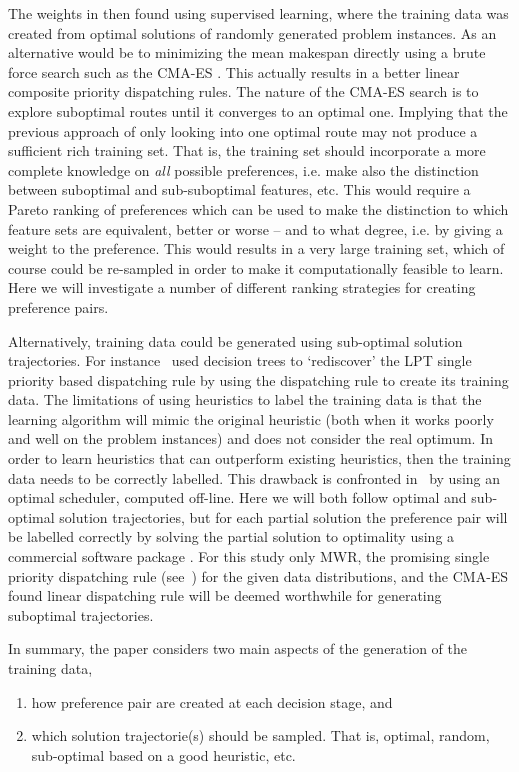 \documentclass[smallextended]{llncs}
\newcommand{\citep}[1]{\cite{#1}}
\begin{document}
The weights in \cite{InRu11a} then found using supervised learning, where the training data was created from optimal 
solutions of randomly generated problem instances. As an alternative would be to minimizing the mean makespan  
directly using a brute force search such as the CMA-ES \citep{Hansen01}. This actually results in a better linear 
composite priority dispatching rules. The nature of the CMA-ES search is to explore suboptimal routes until it 
converges to an optimal one. Implying that the previous approach of only looking into one optimal route may not 
produce a sufficient rich training set. That is, the training set should incorporate a more complete knowledge on 
\emph{all} possible preferences, i.e. make also the distinction between suboptimal and sub-suboptimal features, etc.  
This would require a Pareto ranking of preferences which can be used to make the distinction to which feature sets are 
equivalent, better or worse -- and to what degree, i.e. by giving a weight to the preference. This would results in a 
very large training set, which of course could be re-sampled in order to make it computationally feasible to learn. 
Here we will investigate a number of different ranking strategies for creating preference pairs.

Alternatively, training data could be generated using sub-optimal solution trajectories. For instance~\cite{Siggi05} 
used decision trees to `rediscover' the LPT single priority based dispatching rule by 
using the dispatching rule to create its training data. The limitations of using heuristics to label the training data 
is that the learning algorithm will mimic the original heuristic (both when it works poorly and well on the problem 
instances) and does not consider the real optimum. In order to learn heuristics that can outperform existing 
heuristics, then the training data needs to be correctly labelled. This drawback is confronted 
in~\citep{Malik08,Russell09,Siggi10} by using an optimal scheduler, computed off-line. Here we will both follow 
optimal and sub-optimal solution trajectories, but for each partial solution the preference pair will be labelled 
correctly by solving the partial solution to optimality using a commercial software package \cite{gurobi}.
For this study only MWR, the promising single priority dispatching rule (see~\cite{InRu12a}) for the given data 
distributions, and the CMA-ES found linear dispatching rule will be deemed worthwhile for generating suboptimal 
trajectories.

In summary, the paper considers two main aspects of the generation of the training data, 
\begin{enumerate}
\item how preference pair are created at each decision stage, and
\item which solution trajectorie(s) should be sampled. That is, optimal, random, sub-optimal based on a good 
heuristic, etc.
\end{enumerate}
\end{document}
